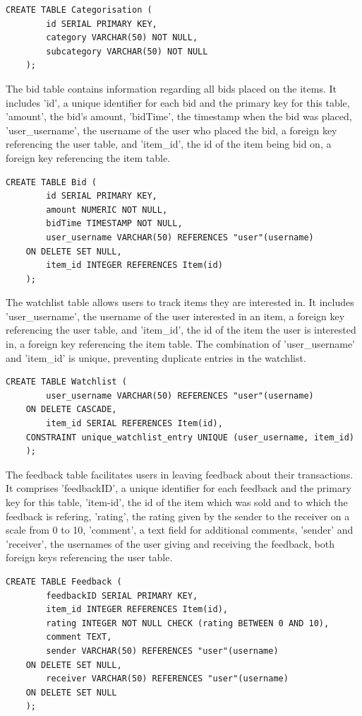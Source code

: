 \begin{lstlisting}[style=sqlStyle]
	CREATE TABLE Categorisation (
		id SERIAL PRIMARY KEY,
		category VARCHAR(50) NOT NULL,
		subcategory VARCHAR(50) NOT NULL
	);
\end{lstlisting}

The bid table contains information regarding all bids placed on the items. It includes 'id', a unique identifier for each bid and the primary key for this table, 'amount', the bid's amount, 'bidTime', the timestamp when the bid was placed, 'user\_username', the username of the user who placed the bid, a foreign key referencing the user table, and 'item\_id', the id of the item being bid on, a foreign key referencing the item table.

\begin{lstlisting}[style=sqlStyle]
	CREATE TABLE Bid (
		id SERIAL PRIMARY KEY,
		amount NUMERIC NOT NULL,
		bidTime TIMESTAMP NOT NULL,
		user_username VARCHAR(50) REFERENCES "user"(username)
	ON DELETE SET NULL,
		item_id INTEGER REFERENCES Item(id)
	);
\end{lstlisting}

The watchlist table allows users to track items they are interested in. It includes 'user\_username', the username of the user interested in an item, a foreign key referencing the user table, and 'item\_id', the id of the item the user is interested in, a foreign key referencing the item table. The combination of 'user\_username' and 'item\_id' is unique, preventing duplicate entries in the watchlist.

\begin{lstlisting}[style=sqlStyle]
	CREATE TABLE Watchlist (
		user_username VARCHAR(50) REFERENCES "user"(username)
	ON DELETE CASCADE,
		item_id SERIAL REFERENCES Item(id),
	CONSTRAINT unique_watchlist_entry UNIQUE (user_username, item_id)
	);
\end{lstlisting}

The feedback table facilitates users in leaving feedback about their transactions. It comprises 'feedbackID', a unique identifier for each feedback and the primary key for this table, 'item-id', the id of the item which was sold and to which the feedback is refering, 'rating', the rating given by the sender to the receiver on a scale from 0 to 10, 'comment', a text field for additional comments, 'sender' and 'receiver', the usernames of the user giving and receiving the feedback, both foreign keys referencing the user table.

\begin{lstlisting}[style=sqlStyle]
	CREATE TABLE Feedback (
		feedbackID SERIAL PRIMARY KEY,
		item_id INTEGER REFERENCES Item(id),
		rating INTEGER NOT NULL CHECK (rating BETWEEN 0 AND 10),
		comment TEXT,
		sender VARCHAR(50) REFERENCES "user"(username)
	ON DELETE SET NULL,
		receiver VARCHAR(50) REFERENCES "user"(username)
	ON DELETE SET NULL
	);
\end{lstlisting}

